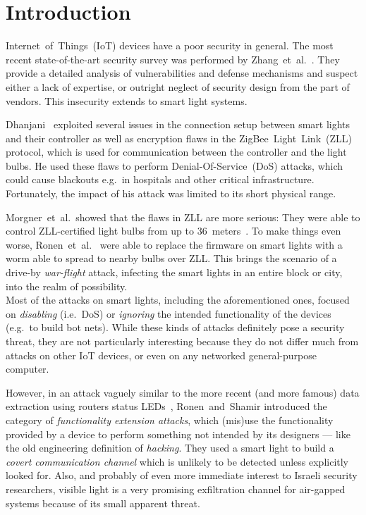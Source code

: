 \section{Introduction} %
\label{sec:intorduction}


Internet~of~Things~(IoT) devices have a poor security in general. The most recent state-of-the-art security survey was performed by Zhang~et~al.~\cite{Zhang:2017:UISTDCBWWNaWWG}. They provide a detailed analysis of vulnerabilities and defense mechanisms and suspect either a lack of expertise, or outright neglect of security design from the part of vendors.
This insecurity extends to smart light systems.

Dhanjani~\cite{Dhanjani:2013:HLSEPHPWLS} exploited several issues in the connection setup between smart lights and their controller as well as encryption flaws in the ZigBee~Light~Link~(ZLL) protocol, which is used for communication between the controller and the light bulbs.
He used these flaws to perform Denial-Of-Service~(DoS) attacks, which could cause blackouts e.g.\ in hospitals and other critical infrastructure.
Fortunately, the impact of his attack was limited to its short physical range.

Morgner~et~al.\ showed that the flaws in ZLL are more serious: They were able to control ZLL-certified light bulbs from up to 36~meters~\cite{Morgner:2016:AYBBUICSSCLS}.
To make things even worse, Ronen~et~al.~\cite{Ronen:2018:IGNCZCR} were able to replace the firmware on smart lights with a worm able to spread to nearby bulbs over ZLL.
This brings the scenario of a drive-by \emph{war-flight} attack, infecting the smart lights in an entire block or city, into the realm of possibility.\\

Most of the attacks on smart lights, including the aforementioned ones, focused on \emph{disabling} (i.e.\ DoS) or \emph{ignoring} the intended functionality of the devices (e.g.\ to build bot nets).
While these kinds of attacks definitely pose a security threat, they are not particularly interesting because they do not differ much from attacks on other IoT devices, or even on any networked general-purpose computer.

However, in an attack vaguely similar to the more recent (and more famous) data extraction using routers status LEDs~\cite{Guri:2017:xCDEANvRL}, Ronen~and~Shamir introduced the category of \emph{functionality extension attacks}, which (mis)use the functionality provided by a device to perform something not intended by its designers --- like the old engineering definition of \emph{hacking}.
They used a smart light to build a \emph{covert communication channel} which is unlikely to be detected unless explicitly looked for.
Also, and probably of even more immediate interest to Israeli security researchers, visible light is a very promising exfiltration channel for air-gapped systems because of its small apparent threat.

